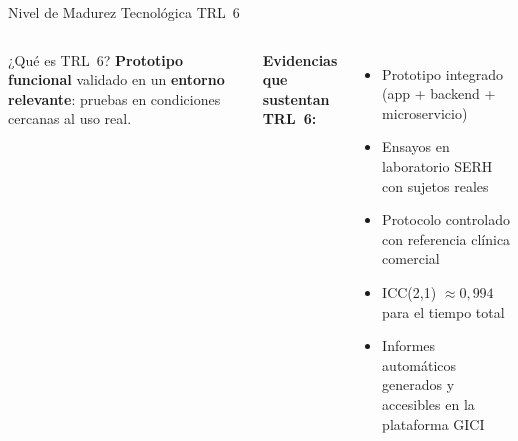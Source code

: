 \documentclass[10pt,aspectratio=169]{beamer}
\begin{document}
\begin{frame}{Nivel de Madurez Tecnológica TRL~6}
  \begin{columns}[c]
      \begin{block}{¿Qué es TRL~6?}
        \textbf{Prototipo funcional} validado en un
        \textbf{entorno relevante}: pruebas en condiciones cercanas
        al uso real.
      \end{block}
      \vspace{0.5em}
      \textbf{Evidencias que sustentan TRL~6:}
      \begin{itemize}
        \item Prototipo integrado (app + backend + microservicio)
        \item Ensayos en laboratorio SERH con sujetos reales
        \item Protocolo controlado con referencia clínica comercial
        \item ICC(2,1) $\approx 0{,}994$ para el tiempo total
        \item Informes automáticos generados y accesibles en la
              plataforma GICI
      \end{itemize}
      \centering
  \end{columns}
\end{frame}
\end{document}
